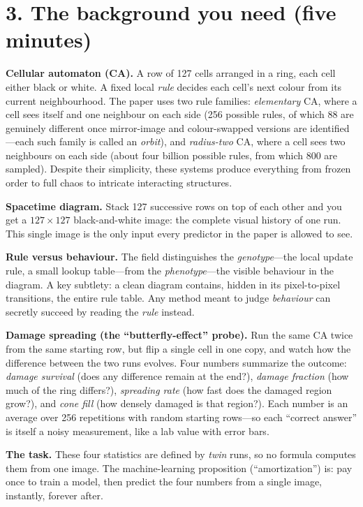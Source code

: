 \documentclass[11pt,a4paper]{article}
\begin{document}
\section*{3. The background you need (five minutes)}

\textbf{Cellular automaton (CA).} A row of 127 cells arranged in a ring,
each cell either black or white. A fixed local \emph{rule} decides each
cell's next colour from its current neighbourhood. The paper uses two rule
families: \emph{elementary} CA, where a cell sees itself and one neighbour
on each side (256 possible rules, of which 88 are genuinely different once
mirror-image and colour-swapped versions are identified---each such family
is called an \emph{orbit}), and \emph{radius-two} CA, where a cell sees two
neighbours on each side (about four billion possible rules, from which 800
are sampled). Despite their simplicity, these systems produce everything
from frozen order to full chaos to intricate interacting structures.

\textbf{Spacetime diagram.} Stack 127 successive rows on top of each other
and you get a $127\times127$ black-and-white image: the complete visual
history of one run. This single image is the only input every predictor in
the paper is allowed to see.

\textbf{Rule versus behaviour.} The field distinguishes the
\emph{genotype}---the local update rule, a small lookup table---from the
\emph{phenotype}---the visible behaviour in the diagram. A key subtlety: a
clean diagram contains, hidden in its pixel-to-pixel transitions, the entire
rule table. Any method meant to judge \emph{behaviour} can secretly succeed
by reading the \emph{rule} instead.

\textbf{Damage spreading (the ``butterfly-effect'' probe).} Run the same CA
twice from the same starting row, but flip a single cell in one copy, and
watch how the difference between the two runs evolves. Four numbers
summarize the outcome: \emph{damage survival} (does any difference remain at
the end?), \emph{damage fraction} (how much of the ring differs?),
\emph{spreading rate} (how fast does the damaged region grow?), and
\emph{cone fill} (how densely damaged is that region?). Each number is an
average over 256 repetitions with random starting rows---so each ``correct
answer'' is itself a noisy measurement, like a lab value with error bars.

\textbf{The task.} These four statistics are defined by \emph{twin} runs, so
no formula computes them from one image. The machine-learning proposition
(``amortization'') is: pay once to train a model, then predict the four
numbers from a single image, instantly, forever after.
\end{document}

